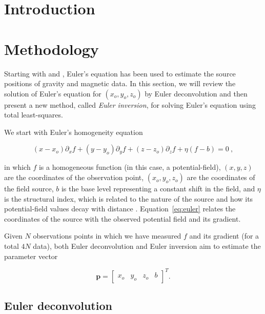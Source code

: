 \section{Introduction}


\section{Methodology}

Starting with \citet{Thompson1982} and \citet{Reid1990}, Euler's equation has
been used to estimate the source positions of gravity and magnetic data.
In this section, we will review the solution of Euler's equation for
$(x_o, y_o, z_o)$ by Euler deconvolution \citep{Reid1990} and then present a
new method, called \textit{Euler inversion}, for solving Euler's equation using
total least-squares.

We start with Euler's homogeneity equation

\begin{equation}
  (x - x_o)\partial_x f + (y - y_o)\partial_y f + (z - z_o)\partial_z f
  + \eta(f - b) = 0
  \ ,
  \label{eq:euler}
\end{equation}

\noindent
in which $f$ is a homogeneous function (in this case, a potential-field),
$(x, y, z)$ are the coordinates of the observation point,
$(x_o, y_o, z_o)$ are the coordinates of the field source,
$b$ is the base level representing a constant shift in the field,
and $\eta$ is the structural index, which is related to the nature of the
source and how its potential-field values decay with distance \citep{Reid2014}.
Equation~\ref{eq:euler} relates the coordinates of the source with the observed
potential field and its gradient.

Given $N$ observations points in which we have measured $f$ and its gradient
(for a total $4N$ data), both Euler deconvolution and Euler inversion aim to
estimate the parameter vector

\begin{equation}
  \mathbf{p} = \begin{bmatrix}x_o & y_o & z_o & b \end{bmatrix}^T.
  \label{eq:p}
\end{equation}

\subsection{Euler deconvolution}

